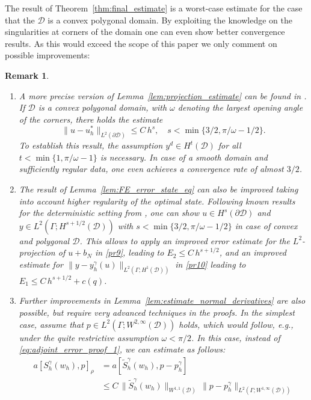 \documentclass[a4paper,10pt]{article}
\newcommand{\cD}{{\mathcal{D}}}
\newtheorem{remark}[theorem]{Remark}
\numberwithin{theorem}{section}
\begin{document}
The result of Theorem~\ref{thm:final_estimate} is a worst-case estimate for the case that the $\cD$ is a convex polygonal domain. By exploiting the knowledge on the singularities at corners of the domain one can even show better convergence results. As this would exceed the scope of this paper we only comment on possible improvements:
\begin{remark}
  \begin{enumerate}[label=\alph*)]
  \item A more precise version of Lemma~\ref{lem:projection_estimate} can be found in \cite[Lemma 5.6]{TApel_MMateos_JPfefferer_ARosch_2018}. If $\cD$ is a convex polygonal domain, with $\omega$ denoting the largest opening angle of the corners, there holds the estimate
    \begin{equation*}
      \|u-u_h^*\|_{L^2(\partial\cD)} \le C\,h^s,\quad s < \min\{3/2,\pi/\omega-1/2\}.
    \end{equation*}
    To establish this result, the assumption $y^d\in H^t(\cD)$ for all $t<\min\{1,\pi/\omega-1\}$ is necessary. In case of a smooth domain and sufficiently regular data, one even achieves a convergence rate of almost $3/2$.
  \item The result of Lemma~\ref{lem:FE_error_state_eq} can also be improved taking into account higher regularity of the optimal state. Following known results for the deterministic setting from \cite{TApel_MMateos_JPfefferer_ARosch_2015}, one can show $u\in H^{s}(\partial\cD)$ and $y\in L^2(\Gamma;H^{s+1/2}(\cD))$ with $s<\min\{3/2,\pi/\omega-1/2\}$ in case of convex and polygonal $\cD$. This allows to apply an improved error estimate for the $L^2$-projection of $u+b_N$ in \eqref{pr9}, leading to $E_2\le C\,h^{s+1/2}$, and an improved estimate for $\|y-y_h^\gamma(u)\|_{L^2(\Gamma;H^1(\cD))}$ in \eqref{pr10} leading to $E_1\le C\,h^{s+1/2} + c(q)$.
  \item Further improvements in Lemma~\ref{lem:estimate_normal_derivatives} are also possible, but require very advanced techniques in the proofs. In the simplest case, assume that $p\in L^2(\Gamma;W^{2,\infty}(\cD))$ holds, which would follow, e.g., under the quite restrictive assumption $\omega < \pi/2$. In this case, instead of \eqref{eq:adjoint_error_proof_1}, we can estimate as follows:
    \begin{align*}
      a[S_h^\gamma(w_h),p]_\rho
      &= a[\widetilde S_h^\gamma(w_h), p-p_h^\gamma]
      \\
      &\le C\,\|\widetilde S_h^\gamma(w_h)\|_{W^{1,1}(\cD)}\,\|p-p_h^\gamma\|_{L^2(\Gamma;W^{1,\infty}(\cD))}

\end{align*}
\end{enumerate}
\end{remark}
\end{document}
